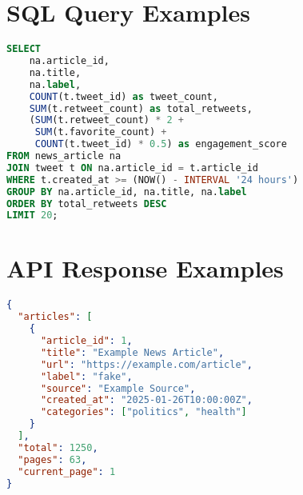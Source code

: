 \documentclass[12pt,a4paper]{article}
\begin{document}
\section{SQL Query Examples}
\begin{lstlisting}[language=SQL, caption=Viral Content Detection Query]
SELECT 
    na.article_id,
    na.title,
    na.label,
    COUNT(t.tweet_id) as tweet_count,
    SUM(t.retweet_count) as total_retweets,
    (SUM(t.retweet_count) * 2 + 
     SUM(t.favorite_count) + 
     COUNT(t.tweet_id) * 0.5) as engagement_score
FROM news_article na
JOIN tweet t ON na.article_id = t.article_id
WHERE t.created_at >= (NOW() - INTERVAL '24 hours')
GROUP BY na.article_id, na.title, na.label
ORDER BY total_retweets DESC
LIMIT 20;
\end{lstlisting}

\section{API Response Examples}
\begin{lstlisting}[language=JSON, caption=API Response Format]
{
  "articles": [
    {
      "article_id": 1,
      "title": "Example News Article",
      "url": "https://example.com/article",
      "label": "fake",
      "source": "Example Source",
      "created_at": "2025-01-26T10:00:00Z",
      "categories": ["politics", "health"]
    }
  ],
  "total": 1250,
  "pages": 63,
  "current_page": 1
}
\end{lstlisting}
\end{document}

